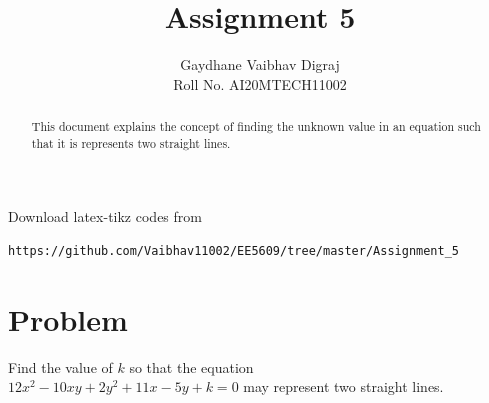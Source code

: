\documentclass[journal,12pt,twocolumn]{IEEEtran}
\begin{document}
     \def\rightbox#1{\makebox[0in][r]{#1}}
     \def\centbox#1{\makebox[0in]{#1}}
     \def\topbox#1{\raisebox{-\baselineskip}[0in][0in]{#1}}
     \def\midbox#1{\raisebox{-0.5\baselineskip}[0in][0in]{#1}}
\vspace{3cm}
\title{Assignment 5}
\author{Gaydhane Vaibhav Digraj \\ Roll No. AI20MTECH11002}
\maketitle
\newpage
\bigskip
\renewcommand{\thefigure}{\theenumi}
\renewcommand{\thetable}{\theenumi}
\begin{abstract}
This document explains the concept of finding the unknown value in an equation such that it is represents two straight lines.
\end{abstract}
%
Download latex-tikz codes from 
%
\begin{lstlisting}
https://github.com/Vaibhav11002/EE5609/tree/master/Assignment_5
\end{lstlisting}
%
\section{Problem}
Find the value of $k$ so that the equation \\$12x^2-10xy+2y^2+11x-5y+k=0$ may represent two straight lines.
\end{document}
